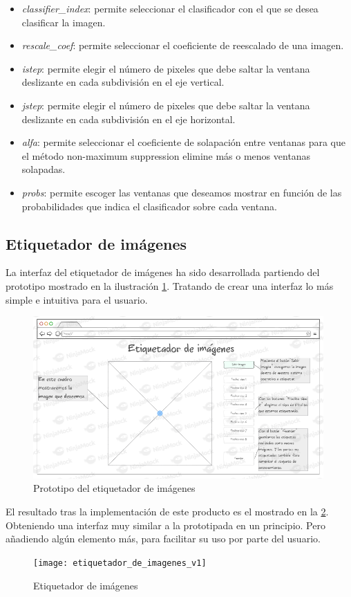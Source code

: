 \begin{itemize}
	\item \textit{classifier_index}: permite seleccionar el clasificador con el que se desea clasificar la imagen.
	\item \textit{rescale_coef}: permite seleccionar el coeficiente de reescalado de una imagen.
	\item \textit{istep}: permite elegir el número de pixeles que debe saltar la ventana deslizante en cada subdivisión en el eje vertical.
	\item \textit{jstep}: permite elegir el número de pixeles que debe saltar la ventana deslizante en cada subdivisión en el eje horizontal.
	\item \textit{alfa}: permite seleccionar el coeficiente de solapación entre ventanas para que el método non-maximum suppression elimine más o menos ventanas solapadas.
	\item \textit{probs}: permite escoger las ventanas que deseamos mostrar en función de las probabilidades que indica el clasificador sobre cada ventana.
\end{itemize}

\subsection{Etiquetador de imágenes}

La interfaz del etiquetador de imágenes ha sido desarrollada partiendo del prototipo mostrado en la ilustración \ref{fig:C.5.2}. Tratando de crear una interfaz lo más simple e intuitiva para el usuario.

\begin{figure}[h]
\centering
\includegraphics[width=0.99\textwidth]{protototipo_etiquetador_de_imagenes}
\caption{Prototipo del etiquetador de imágenes}
\label{fig:C.5.2}
\end{figure}

El resultado tras la implementación de este producto es el mostrado en la \ref{fig:C.5.3}. Obteniendo una interfaz muy similar a la prototipada en un principio. Pero añadiendo algún elemento más, para facilitar su uso por parte del usuario.

\begin{figure}[h]
\centering
\texttt{[image: etiquetador\_de\_imagenes\_v1]}
\caption{Etiquetador de imágenes}
\label{fig:C.5.3}
\end{figure}